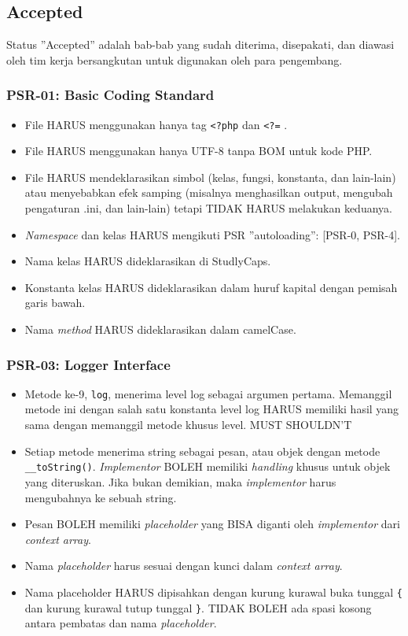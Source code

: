 \subsection{Accepted}
\label{subsec:accepted}
Status ''Accepted'' adalah bab-bab yang sudah diterima, disepakati, dan diawasi oleh tim kerja bersangkutan untuk digunakan oleh para pengembang.

\subsubsection{PSR-01: Basic Coding Standard}
\label{subsubsec:psr01}
\begin{itemize}
	\item File HARUS menggunakan hanya tag \verb|<?php|  dan \verb|<?=| .
	\item File HARUS menggunakan hanya UTF-8 tanpa BOM untuk kode PHP.
	\item File HARUS mendeklarasikan simbol (kelas, fungsi, konstanta, dan lain-lain) atau menyebabkan efek samping (misalnya menghasilkan output, mengubah pengaturan .ini, dan lain-lain) tetapi TIDAK HARUS melakukan keduanya.
	\item \textit{Namespace} dan kelas HARUS mengikuti PSR ''autoloading'': [PSR-0, PSR-4].
	\item Nama kelas HARUS dideklarasikan di StudlyCaps.
	\item Konstanta kelas HARUS dideklarasikan dalam huruf kapital dengan pemisah garis bawah.
	\item Nama \textit{method} HARUS dideklarasikan dalam camelCase.
\end{itemize}

\subsubsection{PSR-03: Logger Interface}
\label{subsubsec:psr03}
\begin{itemize}
	\item Metode ke-9, \verb|log|, menerima level log sebagai argumen pertama. Memanggil metode ini dengan salah satu konstanta level log HARUS memiliki hasil yang sama dengan memanggil metode khusus level. MUST SHOULDN'T
	\item Setiap metode menerima string sebagai pesan, atau objek dengan metode \verb|__toString()|. \textit{Implementor} BOLEH memiliki \textit{handling} khusus untuk objek yang diteruskan. Jika bukan demikian, maka \textit{implementor} harus mengubahnya ke sebuah string.
	\item Pesan BOLEH memiliki \textit{placeholder} yang BISA diganti oleh \textit{implementor} dari \textit{context array}.
	\item Nama \textit{placeholder} harus sesuai dengan kunci dalam \textit{context array}.
	\item Nama placeholder HARUS dipisahkan dengan kurung kurawal buka tunggal \verb|{| dan kurung kurawal tutup tunggal \verb|}|. TIDAK BOLEH ada spasi kosong antara pembatas dan nama \textit{placeholder}.
\end{itemize}

